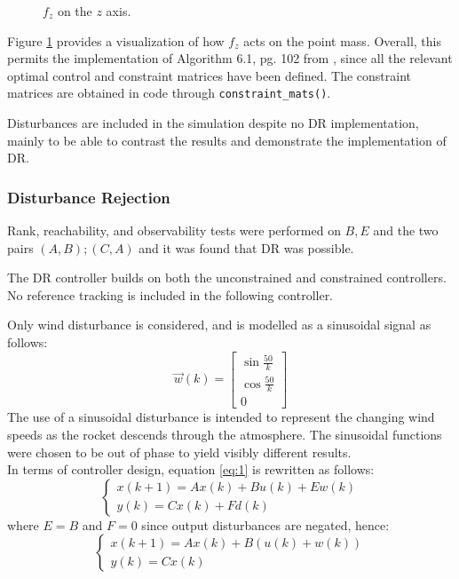 \documentclass[conference, tikz]{IEEEtran}
\begin{document}
\begin{figure}[H]
\centering
{}
\caption{$f_z$ on the $z$ axis.} \label{tikz:axes}
\end{figure}

Figure \ref{tikz:axes} provides a visualization of how $f_z$ acts on the point mass. Overall, this permits the implementation of Algorithm 6.1, pg. 102 from \cite{test}, since all the relevant optimal control and constraint matrices have been defined. The constraint matrices are obtained in code through \verb|constraint_mats()|. 

Disturbances are included in the simulation despite no DR implementation, mainly to be able to contrast the results and demonstrate the implementation of DR.

\subsubsection{Disturbance Rejection}
Rank, reachability, and observability tests were performed on $B, E$ and the two pairs $(A, B); (C, A)$ and it was found that DR was possible. 

The DR controller builds on both the unconstrained and constrained controllers. No reference tracking is included in the following controller. 

Only wind disturbance is considered, and is modelled as a sinusoidal signal as follows:
\[
    \vec{w}(k)
    =
    \begin{bmatrix}
        \sin{\frac{50}{k}}\\
        \cos{\frac{50}{k}}\\
        0
    \end{bmatrix}
\]
The use of a sinusoidal disturbance is intended to represent the changing wind speeds as the rocket descends through the atmosphere. The sinusoidal functions were chosen to be out of phase to yield visibly different results. 
\\
In terms of controller design, equation \ref{eq:1} is rewritten as follows:
\[
    \begin{cases}
    x(k+1) = Ax(k) + Bu(k) + Ew(k)\\
    y(k) = Cx(k) + Fd(k)
    \end{cases}
\]
where $E = B$ and $F=0$ since output disturbances are negated, hence:
\[
    \begin{cases}
        x(k+1) = Ax(k) + B(u(k) + w(k))\\
        y(k) = Cx(k)
    \end{cases}
\]
\end{document}
